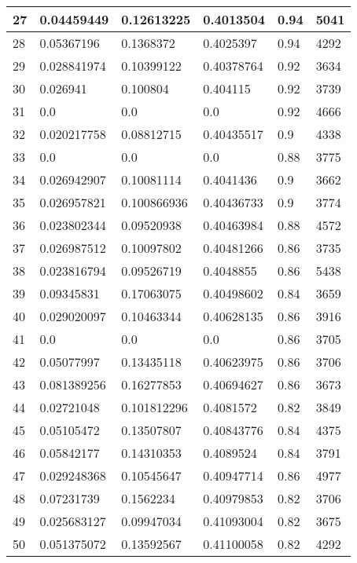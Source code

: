\begin{longtable}{|l|l|l|l|l|l|}
27 & 0.04459449 & 0.12613225 & 0.4013504 & 0.94 & 5041 \\ \hline 
28 & 0.05367196 & 0.1368372 & 0.4025397 & 0.94 & 4292 \\ \hline 
29 & 0.028841974 & 0.10399122 & 0.40378764 & 0.92 & 3634 \\ \hline 
30 & 0.026941 & 0.100804 & 0.404115 & 0.92 & 3739 \\ \hline 
31 & 0.0 & 0.0 & 0.0 & 0.92 & 4666 \\ \hline 
32 & 0.020217758 & 0.08812715 & 0.40435517 & 0.9 & 4338 \\ \hline 
33 & 0.0 & 0.0 & 0.0 & 0.88 & 3775 \\ \hline 
34 & 0.026942907 & 0.10081114 & 0.4041436 & 0.9 & 3662 \\ \hline 
35 & 0.026957821 & 0.100866936 & 0.40436733 & 0.9 & 3774 \\ \hline 
36 & 0.023802344 & 0.09520938 & 0.40463984 & 0.88 & 4572 \\ \hline 
37 & 0.026987512 & 0.10097802 & 0.40481266 & 0.86 & 3735 \\ \hline 
38 & 0.023816794 & 0.09526719 & 0.4048855 & 0.86 & 5438 \\ \hline 
39 & 0.09345831 & 0.17063075 & 0.40498602 & 0.84 & 3659 \\ \hline 
40 & 0.029020097 & 0.10463344 & 0.40628135 & 0.86 & 3916 \\ \hline 
41 & 0.0 & 0.0 & 0.0 & 0.86 & 3705 \\ \hline 
42 & 0.05077997 & 0.13435118 & 0.40623975 & 0.86 & 3706 \\ \hline 
43 & 0.081389256 & 0.16277853 & 0.40694627 & 0.86 & 3673 \\ \hline 
44 & 0.02721048 & 0.101812296 & 0.4081572 & 0.82 & 3849 \\ \hline 
45 & 0.05105472 & 0.13507807 & 0.40843776 & 0.84 & 4375 \\ \hline 
46 & 0.05842177 & 0.14310353 & 0.4089524 & 0.84 & 3791 \\ \hline 
47 & 0.029248368 & 0.10545647 & 0.40947714 & 0.86 & 4977 \\ \hline 
48 & 0.07231739 & 0.1562234 & 0.40979853 & 0.82 & 3706 \\ \hline 
49 & 0.025683127 & 0.09947034 & 0.41093004 & 0.82 & 3675 \\ \hline 
50 & 0.051375072 & 0.13592567 & 0.41100058 & 0.82 & 4292 \\ \hline 
\end{longtable}